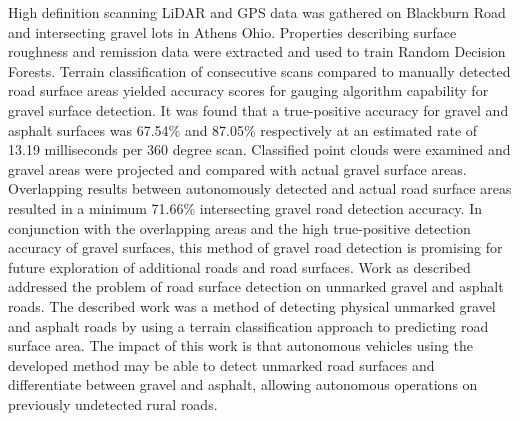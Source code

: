 \documentclass[journal,onecolumn]{IEEEtran}
\begin{document}
		{High definition scanning LiDAR and GPS data was gathered on Blackburn Road and intersecting gravel lots in Athens Ohio. Properties describing surface roughness and remission data were extracted and used to train Random Decision Forests. Terrain classification of consecutive scans compared to manually detected road surface areas yielded accuracy scores for gauging algorithm capability for gravel surface detection. It was found that a true-positive accuracy for gravel and asphalt surfaces was 67.54\% and 87.05\% respectively at an estimated rate of 13.19 milliseconds per 360 degree scan. Classified point clouds were examined and gravel areas were projected and compared with actual gravel surface areas. Overlapping results between autonomously detected and actual road surface areas resulted in a minimum  71.66\% intersecting gravel road detection accuracy. In conjunction with the overlapping areas and the high true-positive detection accuracy of gravel surfaces, this method of gravel road detection is promising for future exploration of additional roads and road surfaces. Work as described addressed the problem of road surface detection on unmarked gravel and asphalt roads. The described work was a method of detecting physical unmarked gravel and asphalt roads by using a terrain classification approach to predicting road surface area. The impact of this work is that autonomous vehicles using the developed method may be able to detect unmarked road surfaces and differentiate between gravel and asphalt, allowing autonomous operations on previously undetected rural roads.} 
	
%
\IEEEpeerreviewmaketitle




\end{document}
